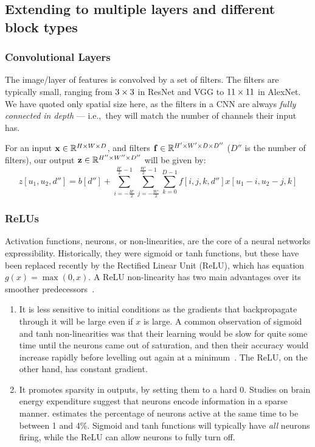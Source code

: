 \subsection{Extending to multiple layers and different block types}

\begin{figure}
  \centering
  
\end{figure}
\subsubsection{Convolutional Layers}
  The image/layer of features is convolved by a set of filters.
  The filters are typically small, ranging from $3\times 3$ in ResNet and VGG
  to $11\times 11$ in AlexNet. We have quoted only spatial size
  here, as the filters in a CNN are always \emph{fully connected in depth} ---
  i.e.,\ they will match the number of channels their input has.

  For an input $\mathbf{x} \in \mathbb{R}^{H\times W\times D}$, and filters 
  $\mathbf{f} \in \mathbb{R}^{H'\times W'  \times D \times D''}$ ($D''$ is the 
  number of filters), our output $\mathbf{z} \in
  \mathbb{R}^{H''\times W'' \times D''}$ will be given by:
  \begin{equation}
    z[u_1, u_2, d''] = b[d''] + \sum_{i=-\frac{H'}{2}}^{\frac{H'}{2}-1}
                       \sum_{j=-\frac{W'}{2}}^{\frac{W'}{2}-1}  \sum_{k=0}^{D-1}  
                        f[i, j, k, d''] x[u_1-i, u_2-j, k]
  \end{equation}

\subsubsection{ReLUs}
  Activation functions, neurons, or non-linearities, are the core of a neural networks
  expressibility. Historically, they were sigmoid or tanh functions, but these
  have been replaced recently by the Rectified Linear Unit (ReLU), which has
  equation $g(x) = \max(0,x)$. A ReLU
  non-linearity has two main advantages over its smoother predecessors~\citep{%
  glorot_deep_2011, nair_rectified_2010}.
  \begin{enumerate}
  \item It is less sensitive to initial conditions as the gradients that
    backpropagate through it will be large even if $x$ is large. A common
    observation of sigmoid and tanh non-linearities was that their learning would
    be slow for quite some time until the neurons came out of saturation, and then
    their accuracy would increase rapidly before levelling out again at
    a minimum~\citep{glorot_understanding_2010}. The ReLU, on the other hand, has
    constant gradient.
  \item It promotes sparsity in outputs, by setting them to a hard 0. Studies
    on brain energy expenditure suggest that neurons encode information in
    a sparse manner. \citet{lennie_cost_2003} estimates the percentage of
    neurons active at the same time to be between 1 and 4\%. Sigmoid and tanh
    functions will typically have \emph{all} neurons firing, while 
    the ReLU can allow neurons to fully turn off.
  \end{enumerate}

